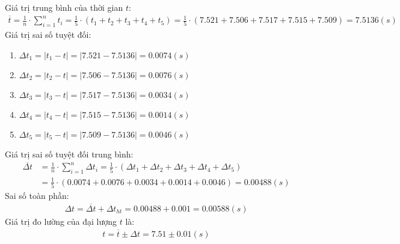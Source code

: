 \documentclass{article}
\begin{document}
Giá trị trung bình của thời gian $t$:
\begin{align*}
    \overline{t} = \frac{1}{n}\cdot\sum_{i = 1}^{n}t_i = \frac{1}{5}\cdot(t_1 + t_2 + t_3 + t_4 + t_5) = \frac{1}{5}\cdot(7.521 + 7.506 + 7.517 + 7.515 + 7.509) = 7.5136(s)
\end{align*}
Giá trị sai số tuyệt đối:
\begin{enumerate}
    \item $\Delta t_1 = |t_1 - t| = |7.521 - 7.5136| = 0.0074(s)$
    \item $\Delta t_2 = |t_2 - t| = |7.506 - 7.5136| = 0.0076(s)$
    \item $\Delta t_3 = |t_3 - t| = |7.517 - 7.5136| = 0.0034(s)$
    \item $\Delta t_4 = |t_4 - t| = |7.515 - 7.5136| = 0.0014(s)$
    \item $\Delta t_5 = |t_5 - t| = |7.509 - 7.5136| = 0.0046(s)$
\end{enumerate}
Giá trị sai số tuyệt đối trung bình:
\begin{align*}
    \overline{\Delta t} &= \frac{1}{n}\cdot\sum_{i=1}^{n}\Delta t_i = \frac{1}{5}\cdot(\Delta t_1 + \Delta t_2 + \Delta t_3 + \Delta t_4 + \Delta t_5)\\ 
    &=  \frac{1}{5}\cdot(0.0074 + 0.0076 + 0.0034 + 0.0014 + 0.0046) = 0.00488(s)
\end{align*}
Sai số toàn phần:
\begin{align*}
    \Delta t = \overline{\Delta t} + \Delta t_{ht} =0.00488 + 0.001 =0.00588(s) 
\end{align*}
Giá trị đo lường của đại lượng $t$ là:
\begin{align*}
    t = \overline{t} \pm \Delta t = 7.51 \pm 0.01(s)
\end{align*}
\end{document}
